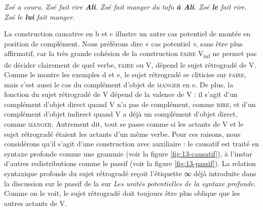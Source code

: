 \ea\label{ex:13-aux}
\ea \textit{Zoé a couru.}
\ex \textit{Zoé fait rire \textbf{Ali}.}
\ex \textit{Zoé fait manger du tofu \textbf{à Ali}.}
\ex \textit{Zoé \textbf{le} fait rire.}
\ex \textit{Zoé le \textbf{lui} fait manger.}\z\z

La construction causative en b et c illustre un autre cas potentiel de montée en position de complément. Nous préférons dire « cas potentiel », sans être plus affirmatif, car la très grande cohésion de la construction \textsc{faire} V\textsubscript{inf} ne permet pas de décider clairement de quel verbe, \textsc{faire} ou V, dépend le sujet rétrogradé de V. Comme le montre les exemples d et e, le sujet rétrogradé se cliticise sur \textsc{faire}, mais c’est aussi le cas du complément d’objet de \textsc{manger} en e. De plus, la fonction du sujet rétrogradé de V dépend de la valence de V : il s’agit d’un complément d’objet direct quand V n’a pas de complément, comme \textsc{rire}, et d’un complément d’objet indirect quand V a déjà un complément d’objet direct, comme \textsc{manger}. Autrement dit, tout se passe comme si les actants de V et le sujet rétrogradé étaient les actants d'un même verbe. Pour ces raisons, nous considérons qu’il s’agit d’une construction avec auxiliaire : le causatif est traité en syntaxe profonde comme une grammie (voir la figure \ref{fig:13-causatif}), à l’instar d’autres redistributions comme le passif (voir la figure \ref{fig:13-passif}). La relation syntaxique profonde du sujet rétrogradé reçoit l’étiquette ∞ déjà introduite dans la discussion sur le passif de la  sur \textit{Les unités potentielles de la syntaxe profonde}. Comme on le voit, le sujet rétrogradé doit toujours être plus oblique que les autres actants de V.

